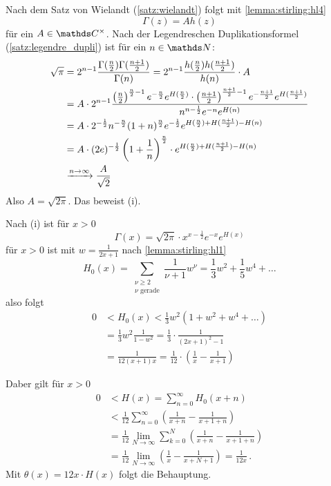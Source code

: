 \begin{bewe-list}
\item Nach dem Satz von Wielandt (\autoref{satz:wielandt}) folgt mit \autoref{lemma:stirling:hl4}
\[
	\Gamma(z) = Ah(z)
\]
für ein $A\in\CC^\times$.
Nach der Legendreschen Duplikationsformel (\autoref{satz:legendre_dupli}) ist für ein $n\in\NN$:
\begin{align*}
	\sqrt{\pi}
	&= 2^{n-1} \frac{\Gamma(\frac{n}{2}) \Gamma(\frac{n+1}{2})}{\Gamma(n)}
	= 2^{n-1} \frac{h(\frac{n}{2}) h(\frac{n+1}{2})}{h(n)} \cdot A \\
	&= A \cdot 2^{n-1}\frac{\left(\frac{n}{2}\right)^{\frac{n}{2}-1} e^{-\frac{n}{2}} e^{H(\frac{n}{2})} \cdot \left(\frac{n+1}{2}\right)^{\frac{n+1}{2}-1} e^{-\frac{n+1}{2}} e^{H(\frac{n+1}{2})}}{n^{n-\frac{1}{2}}e^{-n}e^{H(n)}} \\
	&= A \cdot 2^{-\frac{1}{2}}n^{-\frac{n}{2}}(1+n)^{\frac{n}{2}} e^{-\frac{1}{2}} e^{H(\frac{n}{2})+H(\frac{n+1}{2}) - H(n)} \\
	&= A\cdot (2e)^{-\frac{1}{2}} \left(1+\frac{1}{n}\right)^\frac{n}{2} \cdot e^{H(\frac{n}{2})+H(\frac{n+1}{2}) - H(n)} \\
	&\xrightarrow{n\to\infty} \frac{A}{\sqrt{2}}
\end{align*}
Also $A = \sqrt{2\pi}$. Das beweist (i).



\item Nach (i) ist für $x > 0$
\[
	\Gamma(x) = \sqrt{2\pi} \cdot x^{x-\frac{1}{2}} e^{-x} e^{H(x)}
\]
für $x>0$ ist mit $w = \frac{1}{2x+1}$ nach \autoref{lemma:stirling:hl1}
\[
	H_0(x) = \sum_{\substack{\nu\geq 2 \\ \scriptscriptstyle \nu \text{ gerade}}} \frac{1}{\nu+1}w^\nu
	= \frac{1}{3}w^2 + \frac{1}{5}w^4 + \ldots
\]
also folgt
\begin{align*}
	0
	&< H_0(x)
	< \frac{1}{3}w^2 (1+w^2+w^4+\ldots) \\
	&= \frac{1}{3}w^2 \frac{1}{1-w^2}
	= \frac{1}{3} \cdot \frac{1}{(2x+1)^2-1} \\
	&= \frac{1}{12(x+1)x}
	= \frac{1}{12} \cdot \left( \frac{1}{x} - \frac{1}{x+1} \right)
\end{align*}

Daber gilt für $x > 0$
\begin{align*}
	0
	&< H(x)
	= \sum_{n=0}^\infty H_0(x+n) \\
	&< \frac{1}{12} \sum_{n=0}^\infty \left(\frac{1}{x+n} - \frac{1}{x+1+n}\right) \\
	&= \frac{1}{12} \lim_{N\to\infty} \sum_{k=0}^N \left(\frac{1}{x+n} - \frac{1}{x+1+n}\right) \\
	&= \frac{1}{12}\lim_{N\to\infty} \left(\frac{1}{x}-\frac{1}{x+N+1}\right)
	= \frac{1}{12x}
	\,.
\end{align*}
Mit $\theta(x) = 12x\cdot H(x)$ folgt die Behauptung.
\end{bewe-list}